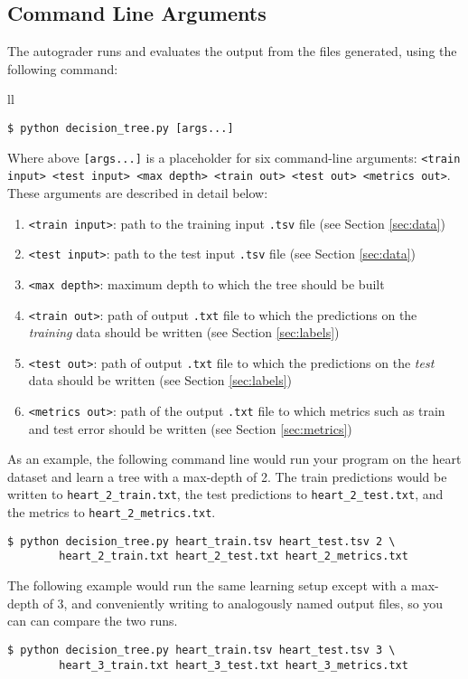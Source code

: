 \subsection{Command Line Arguments}

The autograder runs and evaluates the output from the files  generated, using the following command:

\begin{tabular}{ll}
\begin{lstlisting}[language=Shell]
$ python decision_tree.py [args...]
\end{lstlisting}
\end{tabular}

Where above \lstinline{[args...]} is a placeholder for six command-line arguments: 
\texttt{<train input> <test input> <max depth> <train out> <test out> <metrics out>}. These arguments are described in detail below:
\clearpage
\begin{enumerate}
\item \lstinline{<train input>}: path to the training input \lstinline{.tsv} file (see Section \ref{sec:data})
\item \lstinline{<test input>}: path to the test input \lstinline{.tsv} file (see Section \ref{sec:data})
\item \lstinline{<max depth>}: maximum depth to which the tree should be built
\item \lstinline{<train out>}: path of output \lstinline{.txt} file to which the predictions on the \textit{training} data should be written (see Section \ref{sec:labels})
\item \lstinline{<test out>}: path of output \lstinline{.txt} file to which the predictions on the \emph{test} data should be written (see Section \ref{sec:labels})
\item \lstinline{<metrics out>}: path of the output \lstinline{.txt} file to which metrics such as train and test error should be written (see Section \ref{sec:metrics})
\end{enumerate}

As an example, the following command line would run your program on the heart dataset and learn a tree with a max-depth of 2. The train predictions would be written to \lstinline{heart_2_train.txt}, the test predictions to \lstinline{heart_2_test.txt}, and the metrics to \lstinline{heart_2_metrics.txt}.
%
\begin{lstlisting}[language=Shell]
$ python decision_tree.py heart_train.tsv heart_test.tsv 2 \ 
        heart_2_train.txt heart_2_test.txt heart_2_metrics.txt
\end{lstlisting}
%
The following example would run the same learning setup except with a max-depth of 3, and conveniently writing to analogously named output files, so you can can compare the two runs.
%
\begin{lstlisting}[language=Shell]
$ python decision_tree.py heart_train.tsv heart_test.tsv 3 \ 
        heart_3_train.txt heart_3_test.txt heart_3_metrics.txt
\end{lstlisting}

